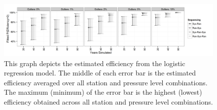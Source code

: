 \documentclass[12pt]{article}
\begin{document}
\begin{figure}[h!]
	\centering
	\includegraphics[width=\textwidth]{Efficiency_Order_Plot_BW}
	\caption{This graph depicts the estimated efficiency from the logistic regression model.  The middle of each error bar is the estimated efficiency averaged over all station and pressure level combinations.  The maximum (minimum) of the error bar is the highest (lowest) efficiency obtained across all station and pressure level combinations.}
	\label{fig:fitEffOrd}
\end{figure}
\end{document}
